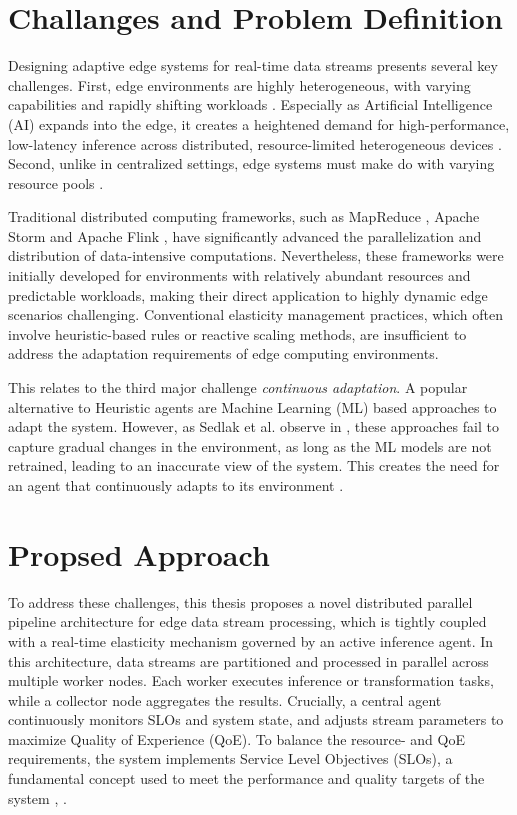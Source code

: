 \section{Challanges and Problem Definition}
Designing adaptive edge systems for real-time data streams presents several key
challenges. First, edge environments are highly heterogeneous, with varying capabilities and
rapidly shifting workloads \cite{danilenka_adaptive_2025}. Especially as Artificial Intelligence (AI) expands into the edge, it creates a heightened demand for high-performance, low-latency inference across distributed, resource-limited heterogeneous devices \cite{oquinn_environment-aware_2025}. Second, unlike in centralized settings, edge systems must make do with varying resource pools \cite{sedlak_equilibrium_2024}.

Traditional distributed computing frameworks, such as MapReduce \cite{dean_mapreduce_2008},
Apache Storm\cite{noauthor_apache_nodate} and Apache Flink \cite{carbone_apache_2015}, have significantly advanced the parallelization and
distribution of data-intensive computations. Nevertheless, these frameworks were initially
developed for environments with relatively abundant resources and predictable workloads,
making their direct application to highly dynamic edge scenarios challenging. Conventional elasticity management practices, which often involve heuristic-based rules or reactive scaling methods, are insufficient to address the adaptation requirements of edge computing environments. 

This relates to the third major challenge \textit{continuous adaptation}\cite{danilenka_adaptive_2025}. A popular alternative to Heuristic agents are Machine Learning (ML) based approaches to adapt the system. However, as Sedlak et al. observe in \cite{sedlak_active_2024}, these approaches fail to capture gradual changes in the environment, as long as the ML models are not retrained, leading to an inaccurate view of the system. This creates the need for an agent that continuously adapts to its environment \cite{sedlak_equilibrium_2024}.

\section{Propsed Approach}
To address these challenges, this thesis proposes a novel distributed parallel pipeline
architecture for edge data stream processing, which is tightly coupled with a real-time elasticity
mechanism governed by an active inference agent. In this architecture, data streams are
partitioned and processed in parallel across multiple worker nodes. Each worker executes
inference or transformation tasks, while a collector node aggregates the results. Crucially, a
central agent continuously monitors SLOs and system state, and adjusts stream parameters to maximize Quality of Experience (QoE). To balance the resource- and QoE requirements, the system implements Service Level Objectives (SLOs), a fundamental concept used to meet the performance and quality targets of the system \cite{sedlak_towards_2025}, \cite{nastic_sloc_2020}.

